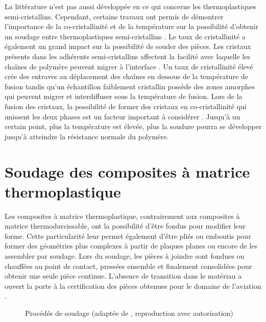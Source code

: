 La littérature n'est pas aussi développée en ce qui concerne les thermoplastiques semi-cristallins. 
Cependant, certains travaux ont permis de démontrer l'importance de la co-cristallinité et de la température sur la possibilité d'obtenir un soudage entre thermoplastiques semi-cristallins  \cite{Xue1998,Smith2001}. 
Le taux de cristallinité a également un grand impact sur la possibilité de souder des pièces. 
Les cristaux présents dans les adhérents semi-cristallins affectent la facilité avec laquelle les chaînes de polymère peuvent migrer à l'interface \cite{Jarrousse2004}. 
Un taux de cristallinité élevé crée des entraves au déplacement des chaînes en dessous de la température de fusion tandis qu'un échantillon faiblement cristallin possède des zones amorphes qui peuvent migrer et interdiffuser sous la température de fusion. 
Lors de la fusion des cristaux, la possibilité de former des cristaux en co-cristallinité qui unissent les deux phases est un facteur important à considérer \cite{Smith2001,Zanetto2001}. 
Jusqu'à un certain point, plus la température est élevée, plus la soudure pourra se développer jusqu'à atteindre la résistance normale du polymère. 

\section{Soudage des composites à matrice thermoplastique}

Les composites à matrice thermoplastique, contrairement aux composites à matrice thermodurcissable, ont la possibilité d'être fondus pour modifier leur forme. 
Cette particularité leur permet également d'être pliés ou emboutis pour former des géométries plus complexes à partir de plaques planes ou encore de les assembler par soudage. 
Lors du soudage, les pièces à joindre sont fondues ou chauffées au point de contact, pressées ensemble et finalement consolidées pour obtenir une seule pièce continue. 
L'absence de transition dans le matériau a ouvert la porte à la certification des pièces obtenues pour le domaine de l'aviation \cite{Gardiner2018}. 

\begin{figure}[h]
	\centering
	
	\caption{Procédés de soudage (adaptée de \cite{Ageorges2001a}, reproduction avec autorisation)}
	\label{fig:arbre_procédé_soudage}
\end{figure}

